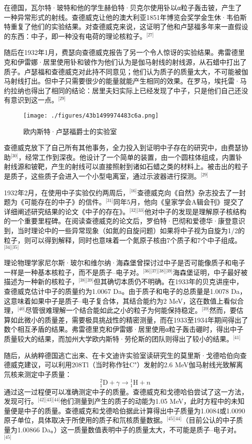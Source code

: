 在德国，瓦尔特·玻特和他的学生赫伯特·贝克尔使用钋以α粒子轰击铍，产生了一种异常形式的射线。查德威克让他的澳大利亚1851年博览会奖学金生休·韦伯斯特重复了他们的实验结果。对查德威克来说，这证明了他和卢瑟福多年来一直假设的东西：中子，即一种没有电荷的理论核粒子。\(^\text{[27]}\)

随后在1932年1月，费瑟向查德威克报告了另一个令人惊讶的实验结果。弗雷德里克和伊雷娜·居里使用钋和铍作为他们认为是伽马射线的射线源，从石蜡中打出了质子。卢瑟福和查德威克对此持不同意见；他们认为质子的质量太大，不可能被伽马射线打出。但中子只需要很少的能量就能产生相同的效果。在罗马，埃托雷·马约拉纳也得出了相同的结论：居里夫妇实际上已经发现了中子，只是他们自己还没有意识到这一点。\(^\text{[29]}\)
\begin{figure}[ht]
\centering
\texttt{[image: ./figures/43b1499974483c6a.png]}
\caption{欧内斯特·卢瑟福爵士的实验室} \label{fig_ZMcdw_2}
\end{figure}
查德威克放下了自己所有其他事务，全力投入到证明中子存在的研究中，由费瑟协助\(^\text{[30]}\)，经常工作到深夜。他设计了一个简单的装置，由一个圆柱体组成，内置钋射线源和铍靶，产生的射线可以直接照射到诸如石蜡之类的材料上。被击出的粒子是质子，这些质子会进入一个小型电离室，通过示波器进行探测。\(^\text{[29]}\)

1932年2月，在使用中子实验仅约两周后，\(^\text{[16]}\)查德威克向《自然》杂志投去了一封题为《可能存在的中子》的信件。\(^\text{[31]}\)同年5月，他向《皇家学会A辑会刊》提交了详细阐述研究结果的论文《中子的存在》。\(^\text{[32][33]}\)他对中子的发现是理解原子核结构的一个重要里程碑。在阅读查德威克的论文后，罗伯特·巴彻和爱德华·康登意识到，当时理论中的一些异常现象（如氮的自旋问题）如果将中子视为自旋为1/2的粒子，则可以得到解释，同时也意味着一个氮原子核由7个质子和7个中子组成。\(^\text{[34][35]}\)

理论物理学家尼尔斯·玻尔和维尔纳·海森堡曾探讨过中子是否可能像质子和电子一样是一种基本核粒子，而不是质子–电子对。\(^\text{[36][37][38][39]}\)海森堡证明，中子最好被描述为一种新的核粒子，\(^\text{[38][39]}\)但其确切本质仍不明确。在1933年的贝克讲座中，查德威克估计中子的质量约为1.0067 Da。由于质子和电子的总质量是1.0078 Da，这意味着如果中子是质子–电子复合体，其结合能约为2 MeV，这在数值上看似合理，\(^\text{[40]}\)尽管很难理解一个结合能如此之小的粒子为何能保持稳定。\(^\text{[39]}\)然而，要估算如此微小的质量差，需要极具挑战性的精密测量，而在1933至1934年期间得出了数个相互矛盾的结果。弗雷德里克和伊雷娜·居里使用α粒子轰击硼时，得出中子质量较大的结果，而加州大学欧内斯特·劳伦斯的团队则得出了较小的结果。\(^\text{[41]}\)

随后，从纳粹德国逃亡出来、在卡文迪许实验室读研究生的莫里斯·戈德哈伯向查德威克建议，可以利用208Tl（当时称作钍C"）发射的2.6 MeV伽马射线光致解离氘核来测定中子质量：
$$
{}^{2}_{1}\text{D} + \gamma \rightarrow {}^{1}_{1}\text{H} + n~
$$
通过这一过程便可以准确测定中子的质量。查德威克和戈德哈伯尝试了这一方法，发现可行。\(^\text{[42][43][44]}\)他们测量到产生的质子的动能为1.05 MeV，此时方程中的未知量便是中子的质量。查德威克和戈德哈伯据此计算得出中子质量为1.0084或1.0090原子单位，具体取决于所使用的质子和氘核质量数据。\(^\text{[45][44]}\)（目前公认的中子质量为1.00866 Da。）这一质量数值表明中子的质量太大，不可能是质子–电子对。\(^\text{[45]}\)

